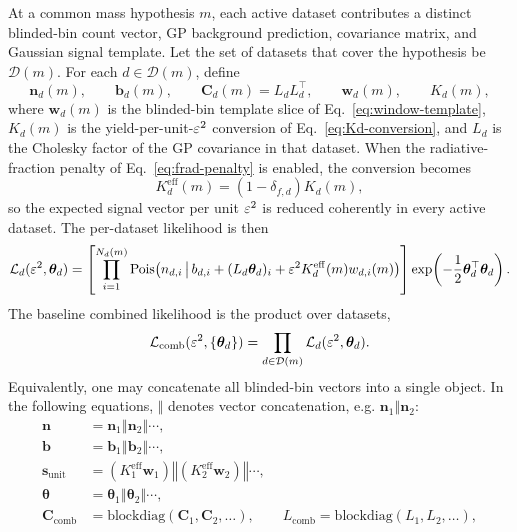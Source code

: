 At a common mass hypothesis $m$, each active dataset contributes a distinct blinded-bin
count vector, GP background prediction, covariance matrix, and Gaussian signal
template. Let the set of datasets that cover the hypothesis be $\mathcal{D}(m)$. For
each $d \in \mathcal{D}(m)$, define
\begin{equation}
\bm{n}_d(m),\qquad
\bm{b}_d(m),\qquad
\bm{C}_d(m)=L_dL_d^\top,\qquad
\bm{w}_d(m),\qquad
K_d(m),
\end{equation}
where $\bm{w}_d(m)$ is the blinded-bin template slice of
Eq.~\eqref{eq:window-template}, $K_d(m)$ is the yield-per-unit-$\varepsilon^2$ conversion of
Eq.~\eqref{eq:Kd-conversion}, and $L_d$ is the Cholesky factor of the GP covariance in
that dataset. When the radiative-fraction penalty of Eq.~\eqref{eq:frad-penalty} is
enabled, the conversion becomes
\begin{equation}
K_d^{\mathrm{eff}}(m) = \left(1-\delta_{f,d}\right)K_d(m),
\label{eq:kdeff}
\end{equation}
so the expected signal vector per unit $\varepsilon^2$ is reduced coherently in every active
dataset. The per-dataset likelihood is then
\begin{equation}
\mathcal{L}_d(\varepsilon^2,\bm{\theta}_d)
=
\left[
\prod_{i=1}^{N_d(m)}
\mathrm{Pois}\!\left(
n_{d,i}\,\middle|\,
b_{d,i} + (L_d\bm{\theta}_d)_i + \varepsilon^2 K_d^{\mathrm{eff}}(m) w_{d,i}(m)
\right)
\right]
\exp\!\left(-\frac{1}{2}\bm{\theta}_d^\top\bm{\theta}_d\right).
\label{eq:dataset-poi-like}
\end{equation}
The baseline combined likelihood is the product over datasets,
\begin{equation}
\mathcal{L}_{\mathrm{comb}}(\varepsilon^2,\{\bm{\theta}_d\})
= \prod_{d \in \mathcal{D}(m)} \mathcal{L}_d(\varepsilon^2,\bm{\theta}_d).
\label{eq:combinedlike-product}
\end{equation}
Equivalently, one may concatenate all blinded-bin vectors into a single object. In the
following equations, $\mathbin{\Vert}$ denotes vector concatenation, e.g.
$\bm{n}_1\mathbin{\Vert}\bm{n}_2$:
\begin{align}
\bm{n} &=
\bm{n}_1\mathbin{\Vert}\bm{n}_2\mathbin{\Vert}\cdots, \\
\bm{b} &=
\bm{b}_1\mathbin{\Vert}\bm{b}_2\mathbin{\Vert}\cdots, \\
\bm{s}_{\mathrm{unit}} &=
\left(K_1^{\mathrm{eff}}\bm{w}_1\right)
\mathbin{\Vert}
\left(K_2^{\mathrm{eff}}\bm{w}_2\right)
\mathbin{\Vert}\cdots, \\
\bm{\theta} &=
\bm{\theta}_1\mathbin{\Vert}\bm{\theta}_2\mathbin{\Vert}\cdots, \\
\bm{C}_{\mathrm{comb}} &=
\mathrm{blockdiag}(\bm{C}_1,\bm{C}_2,\ldots),
\qquad
L_{\mathrm{comb}}=\mathrm{blockdiag}(L_1,L_2,\ldots),
\end{align}
